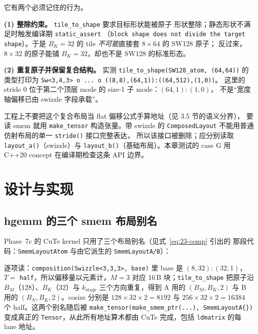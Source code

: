 它有两个必须记住的行为。

\textbf{(1) 整除约束。} \texttt{tile\_\allowbreak{}to\_\allowbreak{}shape} 要求目标形状能被原子
形状整除；静态形状不满足时触发编译期 \texttt{static\_assert}
（\texttt{block shape does not divide the target shape}）。于是
$B_K=32$ 的 tile \emph{不可能}直接套 $8\times64$ 的 SW128 原子；
反过来，$8\times32$ 的原子能铺 $B_K=32$，却也不是 SW128 的标准形态。

\textbf{(2) 重复原子并保留复合结构。} 实测
\texttt{tile\_\allowbreak{}to\_\allowbreak{}shape\allowbreak{}(SW128\_\allowbreak{}atom,\allowbreak{} (64,\allowbreak{}64))} 的类型打印为
\texttt{Sw\allowbreak{}<3,\allowbreak{}4,\allowbreak{}3> o ... o \allowbreak{}(\allowbreak{}(8,\allowbreak{}8),\allowbreak{}(64,\allowbreak{}1)):\allowbreak{}(\allowbreak{}(64,\allowbreak{}512),\allowbreak{}(1,\allowbreak{}0))}。
这里的 stride 0 位于第二个顶层 mode 的 size-1 子 mode：$(64,1){:}(1,0)$，
不是“宽度轴偏移已由 swizzle 字段承载”。

工程上不要把这个复合布局当 flat 偏移公式手算地址（见 3.5 节的语义分界），
要读 smem 就用 \texttt{make\_tensor} 构造张量。带 swizzle 的
\texttt{Composed\allowbreak{}Layout} 不能用普通仿射布局的单一 \texttt{stride()} 接口完整表达，
所以该接口被删除；应分别读取 \texttt{layout\_a()}（swizzle）与
\texttt{layout\_b()}（基础布局）。本章测试的 case G 用 C++20 concept
在编译期检查这条 API 边界。

\section{设计与实现}

\subsection{hgemm 的三个 smem 布局别名}

Phase~7c 的 CuTe kernel 只用了三个布局别名（见式~\eqref{eq:23-comp} 引出的
那段代码：\texttt{Smem\allowbreak{}Layout\allowbreak{}Atom} 与由它派生的 \texttt{Smem\allowbreak{}Layout\allowbreak{}A/\allowbreak{}B}）：

逐项读：\texttt{composition\allowbreak{}(Swizzle\allowbreak{}<3,\allowbreak{}3,\allowbreak{}3>,\allowbreak{} base)} 里 base 是
$(8,32){:}(32,1)$，$T=$ \texttt{half}，所以偏移量以元素计，$M=3$ 对应
16\,B 块；\texttt{tile\_\allowbreak{}to\_\allowbreak{}shape} 把原子沿 $B_M$（128）、$B_K$（32）与
$k_{\text{stage}}$ 三个方向重复，得到 A 用的 $(B_M,B_K,2)$ 与 B 用的
$(B_N,B_K,2)$。cosize 分别是 $128\times32\times2=8192$ 与
$256\times32\times2=16384$ 个 half。这两个别名随后被
\texttt{make\_\allowbreak{}tensor\allowbreak{}(make\_\allowbreak{}smem\_\allowbreak{}ptr\allowbreak{}(.\allowbreak{}.\allowbreak{}.\allowbreak{}),\allowbreak{} Smem\allowbreak{}Layout\allowbreak{}A\{\})} 变成真正的
\texttt{Tensor}，从此所有地址算术都由 CuTe 完成，包括
\texttt{ldmatrix} 的每 lane 地址。


